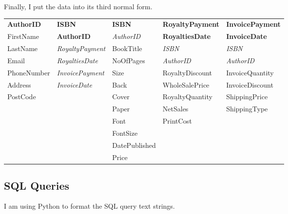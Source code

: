 Finally, I put the data into its third normal form.

\begin{tabular}{|p{2.5cm}|p{2.5cm}|p{2cm}|p{3cm}|p{3cm}|}
    \hline
    \textbf{AuthorID} & \textbf{ISBN} & \textbf{ISBN} & \textbf{RoyaltyPayment} & \textbf{InvoicePayment} \\
    FirstName & \textbf{AuthorID} & \emph{AuthorID} & \textbf{RoyaltiesDate} & \textbf{InvoiceDate} \\
    LastName & \emph{RoyaltyPayment} & BookTitle & \emph{ISBN} & \emph{ISBN} \\
    Email  & \emph{RoyaltiesDate} & NoOfPages & \emph{AuthorID} & \emph{AuthorID} \\
    PhoneNumber & \emph{InvoicePayment} & Size & RoyaltyDiscount & InvoiceQuantity \\
    Address & \emph{InvoiceDate} & Back & WholeSalePrice & InvoiceDiscount \\
    PostCode & & Cover & RoyaltyQuantity & ShippingPrice \\
    & & Paper & NetSales & ShippingType \\
    & & Font & PrintCost & \\
    & & FontSize & &\\
    & & DatePublished & & \\
    & & Price & & \\
    \hline
\end{tabular}

\subsection{SQL Queries}

I am using Python to format the SQL query text strings.

